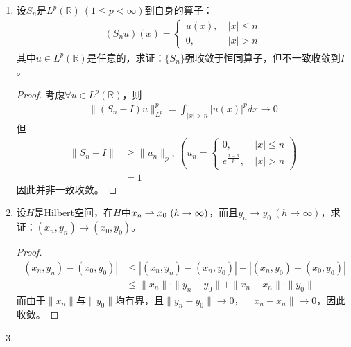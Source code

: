 \begin{enumerate}[leftmargin=2cm, label=\arabic*]
    \item 设$S_n$是$L^p(\mathbb{R})\ (1\leqslant p<\infty)$到自身的算子：
    \begin{align*}
        (S_n u) (x) = \left\lbrace\begin{array}{ll}
            u(x), & \ |x| \leqslant n \\
            0, &\ |x| > n
        \end{array} \right.
    \end{align*}
    其中$u\in L^p(\mathbb{R})$是任意的，求证：$\{S_n\}$强收敛于恒同算子，但不一致收敛到$I$。
    \begin{proof}
        考虑$\forall u\in L^p(\mathbb{R})$，则
        \begin{align*}
            \|(S_n - I)u\|_{L^p}^p = \int_{|x| > n} |u(x)|^p dx \to 0
        \end{align*}
        但
        \begin{align*}
            \|S_n - I\| &\geqslant \|u_n\|_p,\ \left(u_n = \left\lbrace\begin{array}{ll}
                0, &\ |x|\leqslant n \\
                e^{\frac{x-n}{p}}, &\ |x| > n
            \end{array} \right.\right) \\
            & = 1 
        \end{align*}
        因此并非一致收敛。
    \end{proof}

    \item 设$H$是Hilbert空间，在$H$中$x_n\weak x_0\ (h\to\infty)$，而且$y_n\to y_0\ (h\to\infty)$，求证：$(x_n,y_n)\mapsto (x_0,y_0)$。
    \begin{proof}
        \begin{align*}
            |(x_n,y_n) - (x_0,y_0)| & \leqslant |(x_n,y_n) - (x_n, y_0)| + |(x_n, y_0) - (x_0,y_0)| \\
            & \leqslant \|x_n\|\cdot\|y_n - y_0\| + \|x_n - x_n\|\cdot \|y_0\| 
        \end{align*}
        而由于$\|x_n\|$与$\|y_0\|$均有界，且$\|y_n - y_0\|\to 0$，$\|x_n - x_n\|\to 0$，因此收敛。
    \end{proof}

    \item 



    
\end{enumerate}

 



